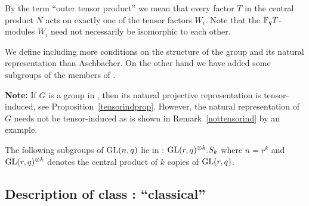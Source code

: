 By the term ``outer tensor product'' we mean that every factor
$T$ in the central product $N$ acts on exactly one of the tensor factors $W_i$.
Note that the $\mathbb{F}_q T$-modules $W_i$ need not necessarily be
isomorphic to each other.

\medskip
{} 
We define  including more conditions on the structure of the group
and its natural representation than Aschbacher. On the other hand we
have added some subgroups of the members of .

\smallskip
\textbf{Note:} 
If $G$ is a
group in , then its natural projective representation
is tensor-induced,
see Proposition~\ref{tensorindprop}. However, the natural
representation of $G$ needs not be tensor-induced as is shown in
Remark~\ref{nottensorind} by an example.

\smallskip
\exmemb
The following subgroups of $\GL(n,q)$ lie in :
$\GL(r,q)^{\otimes k}.S_k$ where $n=r^k$ and $\GL(r,q)^{\otimes k}$ 
denotes the central product of $k$ copies of $\GL(r,q)$.

\subsection{Description of class : ``classical''}
\label{descC8}


